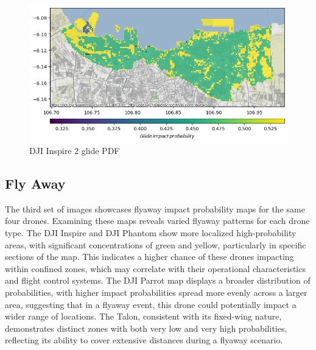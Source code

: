 \documentclass[12pt]{report}
\begin{document}
        \begin{figure}[H]
            \centering
            \includegraphics[width=\textwidth]{Plot/inspire/glide_pdf.png}
            \caption{DJI Inspire 2 glide PDF}
        \end{figure}

        \subsection{Fly Away}
        The third set of images showcases flyaway impact probability maps for the same four drones. Examining these
        maps reveals varied flyaway patterns for each drone type. The DJI Inspire and DJI Phantom show more localized
        high-probability areas, with significant concentrations of green and yellow, particularly in specific sections
        of the map. This indicates a higher chance of these drones impacting within confined zones, which may correlate
        with their operational characteristics and flight control systems. The DJI Parrot map displays a broader
        distribution of probabilities, with higher impact probabilities spread more evenly across a larger area,
        suggesting that in a flyaway event, this drone could potentially impact a wider range of locations. The Talon,
        consistent with its fixed-wing nature, demonstrates distinct zones with both very low and very high
        probabilities, reflecting its ability to cover extensive distances during a flyaway scenario.
\end{document}
